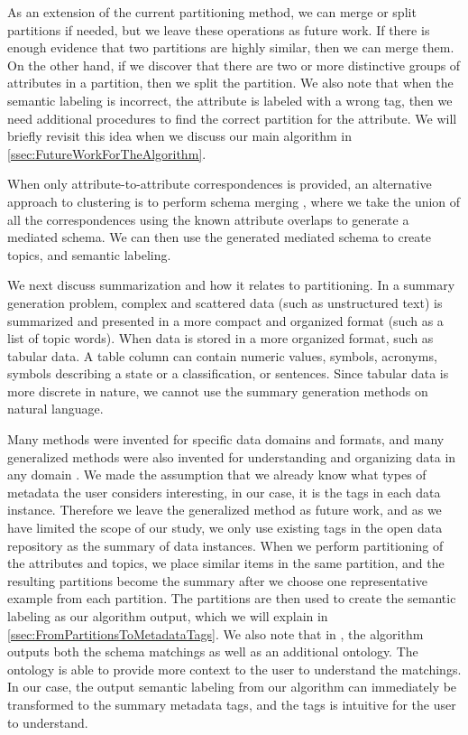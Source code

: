 As an extension of the current partitioning method, we can merge or split partitions if needed, but we leave these operations as future work. If there is enough evidence that two partitions are highly similar, then we can merge them. On the other hand, if we discover that there are two or more distinctive groups of attributes in a partition, then we split the partition. We also note that when the semantic labeling is incorrect, the attribute is labeled with a wrong tag, then we need additional procedures to find the correct partition for the attribute. We will briefly revisit this idea when we discuss our main algorithm in \autoref{ssec:FutureWorkForTheAlgorithm}.

When only attribute-to-attribute correspondences is provided, an alternative approach to clustering is to perform schema merging \cite{Pottinger2008Schema}, where we take the union of all the correspondences using the known attribute overlaps to generate a mediated schema. We can then use the generated mediated schema to create topics, and semantic labeling.

We next discuss summarization and how it relates to partitioning. In a summary generation problem, complex and scattered data (such as unstructured text) is summarized and presented in a more compact and organized format (such as a list of topic words). When data is stored in a more organized format, such as tabular data. A table column can contain numeric values, symbols, acronyms, symbols describing a state or a classification, or sentences. Since tabular data is more discrete in nature, we cannot use the summary generation methods on natural language.

Many methods were invented for specific data domains and formats, and many generalized methods were also invented for understanding and organizing data in any domain \cite{Park2015Evaluation}. We made the assumption that we already know what types of metadata the user considers interesting, in our case, it is the tags in each data instance. Therefore we leave the generalized method as future work, and as we have limited the scope of our study, we only use existing tags in the open data repository as the summary of data instances. When we perform partitioning of the attributes and topics, we place similar items in the same partition, and the resulting partitions become the summary after we choose one representative example from each partition. The partitions are then used to create the semantic labeling as our algorithm output, which we will explain in \autoref{ssec:FromPartitionsToMetadataTags}. We also note that in \cite{Diego2018Machine}, the algorithm outputs both the schema matchings as well as an additional ontology. The ontology is able to provide more context to the user to understand the matchings. In our case, the output semantic labeling from our algorithm can immediately be transformed to the summary metadata tags, and the tags is intuitive for the user to understand.

